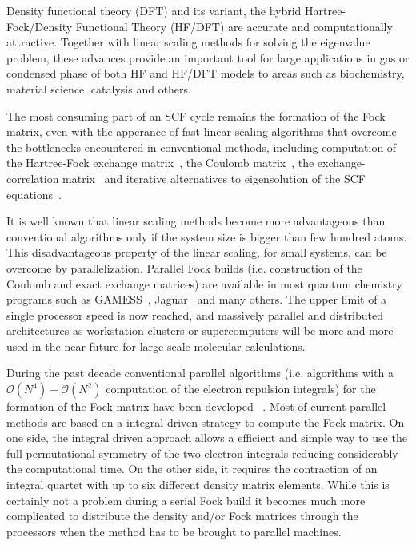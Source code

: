 \documentclass[prl,twocolumn,showpacs,twocolumngrid,superbib]{revtex4}
\begin{document}
 Density functional theory (DFT) and its variant, 
 the hybrid Hartree-Fock/Density Functional Theory (HF/DFT) are accurate and
 computationally attractive. Together with linear scaling methods 
 for solving the eigenvalue problem, these
 advances provide an important tool for large applications in gas or condensed phase 
 of both HF and HF/DFT models to areas such as biochemistry, material science, catalysis and others.


 The most consuming part of an SCF cycle remains the formation
 of the Fock matrix, even with the apperance of fast linear
 scaling algorithms 
 that overcome the bottlenecks encountered in conventional methods,
 including computation of the Hartree-Fock exchange 
 matrix~\cite{ESchwegler96,ESchwegler97,ESchwegler98A,ESchwegler99,ESchwegler00,CTymczak04b},
 the Coulomb 
 matrix~\cite{CWhite94B,CWhite96A,MChallacombe96,MChallacombe96B,MStrain96,
              JPerezjorda97,MChallacombe97,CTymczak04a}, 
 the exchange-correlation 
 matrix~\cite{CTymczak04a,Jorda95,RStratmann96,CGuerra98,MChallacombe00A}
 and iterative alternatives to eigensolution of the SCF 
 equations~\cite{XLi93,MDaw93,ADaniels97,APalser98,
                 MChallacombe99,ANiklasson02A,ANiklasson03}.

 It is well known that linear scaling 
 methods become more advantageous than conventional  
 algorithms only if the system size is bigger than
 few hundred atoms. This disadvantageous property of the linear
 scaling, for small systems, can be overcome by 
 parallelization. 
 Parallel Fock builds (i.e. construction of the Coulomb and exact exchange matrices)
 are available in most quantum
 chemistry programs such as GAMESS~\cite{GAMESS},
 Jaguar~\cite{DChasman98} and many others. 
 The upper limit of a single processor speed
 is now reached, and massively parallel and distributed
 architectures as workstation clusters or supercomputers will be 
 more and more used in the near future for large-scale 
 molecular calculations.


 During the past decade conventional parallel algorithms 
 (i.e. algorithms with a $\mathcal{O}(N^4)-\mathcal{O}(N^2)$ computation 
 of the electron repulsion integrals) for the 
 formation of the Fock matrix have been developed
 ~\cite{MColvin93,TFurlani95,IFoster96,RHarrison96,YAlexeev02,HTakashima02,RLindh03}.
 Most of current parallel methods are based on a integral driven strategy
 to compute the Fock matrix. On one side, the integral driven approach
 allows a efficient and simple way to use the full permutational symmetry
 of the two electron integrals reducing considerably the computational time. 
 On the other side, it requires the contraction of an integral quartet with up to six 
 different density matrix elements.
 While this is certainly not a problem during a serial Fock build it becomes
 much more complicated to distribute the density and/or Fock matrices through the 
 processors when the method has to be brought to parallel machines.
\end{document}
